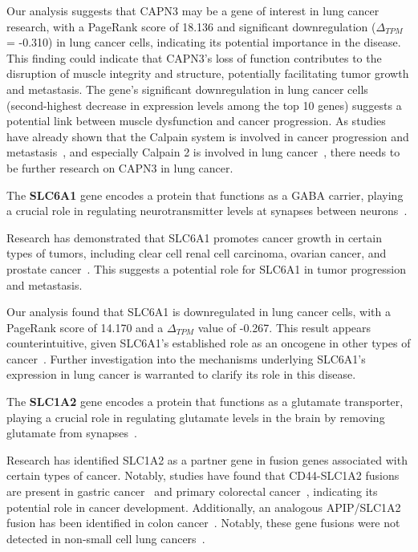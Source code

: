 Our analysis suggests that CAPN3 may be a gene of interest in lung cancer research,
with a PageRank score of 18.136 and significant downregulation ($\Delta_{TPM}$ = -0.310) in lung cancer cells,
indicating its potential importance in the disease.
This finding could indicate that CAPN3's loss of function contributes to the disruption of muscle integrity and structure,
potentially facilitating tumor growth and metastasis.
The gene's significant downregulation in lung cancer cells (second-highest decrease in expression levels among the top 10 genes)
suggests a potential link between muscle dysfunction and cancer progression.
As studies have already shown that the Calpain system is involved in cancer progression and metastasis~\cite{Storr2011Calpain},
and especially Calpain 2 is involved in lung cancer~\cite{Xu2019Calpain}, there needs to be further research on CAPN3 in lung cancer.
\newline

The \textbf{SLC6A1} gene encodes a protein that functions as a GABA carrier,
playing a crucial role in regulating neurotransmitter levels at synapses between neurons~\cite{Chen2020SLC6A1}.

Research has demonstrated that SLC6A1 promotes cancer growth in certain types of tumors,
including clear cell renal cell carcinoma, ovarian cancer, and prostate cancer~\cite{Chen2020SLC6A1}.
This suggests a potential role for SLC6A1 in tumor progression and metastasis.

Our analysis found that SLC6A1 is downregulated in lung cancer cells,
with a PageRank score of 14.170 and a $\Delta_{TPM}$ value of -0.267.
This result appears counterintuitive, given SLC6A1's established role as an oncogene in other types of cancer~\cite{Chen2020SLC6A1}.
Further investigation into the mechanisms underlying SLC6A1's expression in lung cancer is warranted to clarify its role in this disease.
\newline

The \textbf{SLC1A2} gene encodes a protein that functions as a glutamate transporter,
playing a crucial role in regulating glutamate levels in the brain by removing glutamate from synapses~\cite{NCBI2017SLC1A2}.

Research has identified SLC1A2 as a partner gene in fusion genes associated with certain types of cancer.
Notably, studies have found that CD44-SLC1A2 fusions are present in gastric cancer~\cite{Tao2011CD44} and
primary colorectal cancer~\cite{Shinmura2015CD44}, indicating its potential role in cancer development.
Additionally, an analogous APIP/SLC1A2 fusion has been identified in colon cancer~\cite{Giacomini2013Breakpoint}.
Notably, these gene fusions were not detected in non-small cell lung cancers~\cite{Shinmura2015CD44}.

